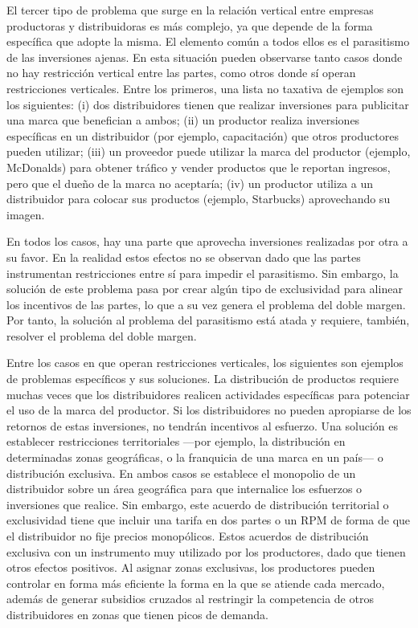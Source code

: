 \documentclass[
  12pt,
  spanish,
]{book}
\begin{document}
El tercer tipo de problema que surge en la relación vertical entre empresas productoras y distribuidoras es más complejo, ya que depende de la forma específica que adopte la misma. El elemento común a todos ellos es el parasitismo de las inversiones ajenas. En esta situación pueden observarse tanto casos donde no hay restricción vertical entre las partes, como otros donde sí operan restricciones verticales. Entre los primeros, una lista no taxativa de ejemplos son los siguientes: (i) dos distribuidores tienen que realizar inversiones para publicitar una marca que benefician a ambos; (ii) un productor realiza inversiones específicas en un distribuidor (por ejemplo, capacitación) que otros productores pueden utilizar; (iii) un proveedor puede utilizar la marca del productor (ejemplo, McDonalds) para obtener tráfico y vender productos que le reportan ingresos, pero que el dueño de la marca no aceptaría; (iv) un productor utiliza a un distribuidor para colocar sus productos (ejemplo, Starbucks) aprovechando su imagen.

En todos los casos, hay una parte que aprovecha inversiones realizadas por otra a su favor. En la realidad estos efectos no se observan dado que las partes instrumentan restricciones entre sí para impedir el parasitismo. Sin embargo, la solución de este problema pasa por crear algún tipo de exclusividad para alinear los incentivos de las partes, lo que a su vez genera el problema del doble margen. Por tanto, la solución al problema del parasitismo está atada y requiere, también, resolver el problema del doble margen.

Entre los casos en que operan restricciones verticales, los siguientes son ejemplos de problemas específicos y sus soluciones. La distribución de productos requiere muchas veces que los distribuidores realicen actividades específicas para potenciar el uso de la marca del productor. Si los distribuidores no pueden apropiarse de los retornos de estas inversiones, no tendrán incentivos al esfuerzo. Una solución es establecer restricciones territoriales ---por ejemplo, la distribución en determinadas zonas geográficas, o la franquicia de una marca en un país--- o distribución exclusiva. En ambos casos se establece el monopolio de un distribuidor sobre un área geográfica para que internalice los esfuerzos o inversiones que realice. Sin embargo, este acuerdo de distribución territorial o exclusividad tiene que incluir una tarifa en dos partes o un RPM de forma de que el distribuidor no fije precios monopólicos. Estos acuerdos de distribución exclusiva con un instrumento muy utilizado por los productores, dado que tienen otros efectos positivos. Al asignar zonas exclusivas, los productores
pueden controlar en forma más eficiente la forma en la que se atiende cada mercado, además de generar subsidios cruzados al restringir la competencia de otros distribuidores en zonas que tienen picos de demanda.
\end{document}
